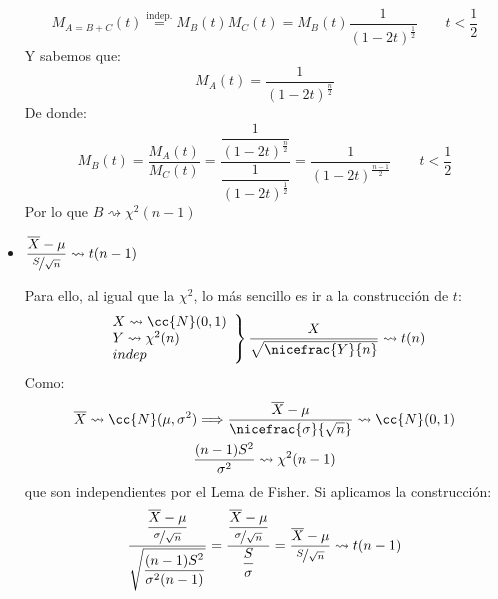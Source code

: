 \begin{coro}
\begin{itemize}
\begin{equation*}
                M_{A=B+C}(t) \stackrel{\text{indep.}}{=} M_B(t) M_C(t) = M_B(t) \dfrac{1}{{(1-2t)}^{\frac{1}{2}}} \qquad t < \frac{1}{2}
            \end{equation*}
            Y sabemos que:
            \begin{equation*}
                M_A(t) = \dfrac{1}{{(1-2t)}^{\frac{n}{2}}}
            \end{equation*}
            De donde:
            \begin{equation*}
                M_B(t) = \dfrac{M_A(t)}{M_C(t)} = \dfrac{\dfrac{1}{{(1-2t)}^{\frac{n}{2}}}}{\dfrac{1}{{(1-2t)}^{\frac{1}{2}}}} = \dfrac{1}{{(1-2t)}^{\frac{n-1}{2}}} \qquad  t<\frac{1}{2}
            \end{equation*}
            Por lo que $B\rightsquigarrow \chi^2(n-1)$
        \item $\dfrac{\overline{X}-\mu}{\nicefrac{S}{\sqrt{n}}}\rightsquigarrow t(n-1)$

            Para ello, al igual que la $\chi^2$, lo más sencillo es ir a la construcción de $t$:
            \begin{equation*}
                \left.\begin{array}{l}
                        X\rightsquigarrow \cc{N}(0,1) \\
                        Y \rightsquigarrow\chi^2(n) \\
                        indep
                \end{array}\right\} \dfrac{X}{\sqrt{\nicefrac{Y}{n}}} \rightsquigarrow t(n)
            \end{equation*}
            Como:
            \begin{gather*}
                \overline{X}\rightsquigarrow\cc{N}(\mu,\sigma^2)\Longrightarrow \dfrac{\overline{X}-\mu}{\nicefrac{\sigma}{\sqrt{n}}} \rightsquigarrow \cc{N}(0,1) \\
                \dfrac{(n-1)S^2}{\sigma^2} \rightsquigarrow \chi^2(n-1)
            \end{gather*}
            que son independientes por el Lema de Fisher. Si aplicamos la construcción:
            \begin{equation*}
                \dfrac{\dfrac{\overline{X}-\mu}{\nicefrac{\sigma}{\sqrt{n}}}}{\sqrt{\dfrac{(n-1)S^2}{\sigma^2(n-1)}}} = \dfrac{\dfrac{\overline{X}-\mu}{\nicefrac{\sigma}{\sqrt{n}}}}{\dfrac{S}{\sigma}} = \dfrac{\overline{X}-\mu}{\nicefrac{S}{\sqrt{n}}} \rightsquigarrow t(n-1)
            \end{equation*}
    \end{itemize}
\end{coro} 
